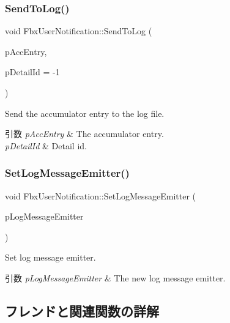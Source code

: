 \subsubsection{\texorpdfstring{Send\+To\+Log()}{SendToLog()}\hspace{0.1cm}{\footnotesize\ttfamily [2/2]}}
{\footnotesize\ttfamily void Fbx\+User\+Notification\+::\+Send\+To\+Log (\begin{DoxyParamCaption}\item[{const \hyperlink{class_fbx_accumulator_entry}{Fbx\+Accumulator\+Entry} $\ast$}]{p\+Acc\+Entry,  }\item[{int}]{p\+Detail\+Id = {\ttfamily -\/1} }\end{DoxyParamCaption})\hspace{0.3cm}{\ttfamily [protected]}}

Send the accumulator entry to the log file. 
\begin{DoxyParams}{引数}
{\em p\+Acc\+Entry} & The accumulator entry. \\
\hline
{\em p\+Detail\+Id} & Detail id. \\
\hline
\end{DoxyParams}
\mbox{\label{class_fbx_user_notification_ab58b3104014b80b853b43f1a264bb999}} 
\subsubsection{\texorpdfstring{Set\+Log\+Message\+Emitter()}{SetLogMessageEmitter()}}
{\footnotesize\ttfamily void Fbx\+User\+Notification\+::\+Set\+Log\+Message\+Emitter (\begin{DoxyParamCaption}\item[{Fbx\+Message\+Emitter $\ast$}]{p\+Log\+Message\+Emitter }\end{DoxyParamCaption})}

Set log message emitter. 
\begin{DoxyParams}{引数}
{\em p\+Log\+Message\+Emitter} & The new log message emitter. \\
\hline
\end{DoxyParams}


\subsection{フレンドと関連関数の詳解}
\mbox{\label{class_fbx_user_notification_a991cf5f73d3877784532bf31cbf31c4a}} 
